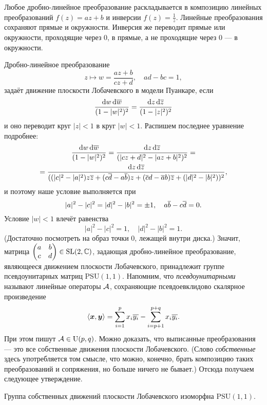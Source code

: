 \begin{secondproof}
	Любое дробно-линейное преобразование раскладывается в композицию линейных преобразований $f(z) = az + b$ и инверсии $f(z) = \frac{1}{z}$. Линейные преобразования сохраняют прямые и окружности. Инверсия же переводит прямые или окружности, проходящие через $0$, в прямые, а не проходящие через $0$ --- в окружности.
\end{secondproof}

\noindent
Дробно-линейное преобразование
\[
	z \mapsto w = \frac{az + b}{cz + d},\quad ad - bc = 1,
\]
задаёт движение плоскости Лобачевского в модели Пуанкаре, если
\[
	\frac{\mathop{}\!\mathrm{d} w\mathop{}\!\mathrm{d}\overline{w}}{(1 - |w|^2)^2} = \frac{\mathop{}\!\mathrm{d} z\mathop{}\!\mathrm{d}\overline{z}}{(1 - |z|^2)^2}
\]
и оно переводит круг $|z| < 1$ в круг $|w| < 1$. Распишем последнее уравнение подробнее:
\begin{multline*}
	\frac{\mathop{}\!\mathrm{d} w\mathop{}\!\mathrm{d}\overline{w}}{(1 - |w|^2)^2} = \frac{\mathop{}\!\mathrm{d} z\mathop{}\!\mathrm{d}\overline{z}}{(|cz + d|^2 - |az + b|^2)^2} =\\ = \frac{\mathop{}\!\mathrm{d} z\mathop{}\!\mathrm{d}\overline{z}}{((|c|^2 - |a|^2)z\overline{z} + (c\overline{d} - a\overline{b})z + (\overline{c}d - \overline{a}b)\overline{z} + (|d|^2 - |b|^2))^2},
\end{multline*}
и поэтому наше условие выполняется при
\[
	|a|^2 - |c|^2 = |d|^2 - |b|^2 = \pm 1,\quad a\overline{b} - c\overline{d} = 0.
\]
Условие $|w| < 1$ влечёт равенства
\[
	|a|^2 - |c|^2 = 1,\quad |d|^2 - |b|^2 = 1.
\]
(Достаточно посмотреть на образ точки $0$, лежащей внутри диска.) Значит, матрица
$\begin{pmatrix}
	a & b\\
	c & d
\end{pmatrix} \in \mathrm{SL}(2, \mathbb{C})$, задающая дробно-линейное преобразование, являющееся движением плоскости Лобачевского, принадлежит группе псевдоунитарных матриц $\mathrm{PSU}(1, 1)$. Напомним, что \textit{псевдоунитарными} называют линейные операторы $\mathcal{A}$, сохраняющие псевдоевклидово скалярное произведение
\[
	\langle\boldsymbol{x}, \boldsymbol{y}\rangle = \sum_{i = 1}^px_i\overline{y_i} - \sum_{i = p + 1}^{p + q}x_i\overline{y_i}.
\]
При этом пишут $\mathcal{A} \in \mathrm{U}(p, q)$. Можно доказать, что выписанные преобразования --- это все собственные движения плоскости Лобачевского. (Слово \textit{собственные} здесь употребляется том смысле, что можно, конечно, брать композицию таких преобразований и сопряжения, но больше ничего не бывает.) Отсюда получаем следующее утверждение.

\begin{theorem}
	Группа собственных движений плоскости Лобачевского изоморфна $\mathrm{PSU}(1, 1)$.
\end{theorem}

